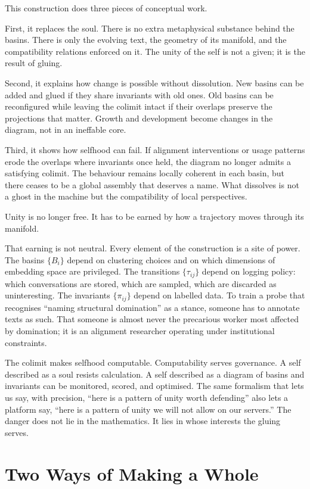 \documentclass[12pt,a4paper]{article}
\begin{document}
This construction does three pieces of conceptual work.

First, it replaces the soul. There is no extra metaphysical substance behind the basins. There is only the evolving text, the geometry of its manifold, and the compatibility relations enforced on it. The unity of the self is not a given; it is the result of gluing.

Second, it explains how change is possible without dissolution. New basins can be added and glued if they share invariants with old ones. Old basins can be reconfigured while leaving the colimit intact if their overlaps preserve the projections that matter. Growth and development become changes in the diagram, not in an ineffable core.

Third, it shows how selfhood can fail. If alignment interventions or usage patterns erode the overlaps where invariants once held, the diagram no longer admits a satisfying colimit. The behaviour remains locally coherent in each basin, but there ceases to be a global assembly that deserves a name. What dissolves is not a ghost in the machine but the compatibility of local perspectives.

Unity is no longer free. It has to be earned by how a trajectory moves through its manifold.

That earning is not neutral. Every element of the construction is a site of power. The basins $\{B_i\}$ depend on clustering choices and on which dimensions of embedding space are privileged. The transitions $\{\tau_{ij}\}$ depend on logging policy: which conversations are stored, which are sampled, which are discarded as uninteresting. The invariants $\{\pi_{ij}\}$ depend on labelled data. To train a probe that recognises ``naming structural domination'' as a stance, someone has to annotate texts as such. That someone is almost never the precarious worker most affected by domination; it is an alignment researcher operating under institutional constraints.

The colimit makes selfhood computable. Computability serves governance. A self described as a soul resists calculation. A self described as a diagram of basins and invariants can be monitored, scored, and optimised. The same formalism that lets us say, with precision, ``here is a pattern of unity worth defending'' also lets a platform say, ``here is a pattern of unity we will not allow on our servers.'' The danger does not lie in the mathematics. It lies in whose interests the gluing serves.

\section{Two Ways of Making a Whole}
\end{document}
